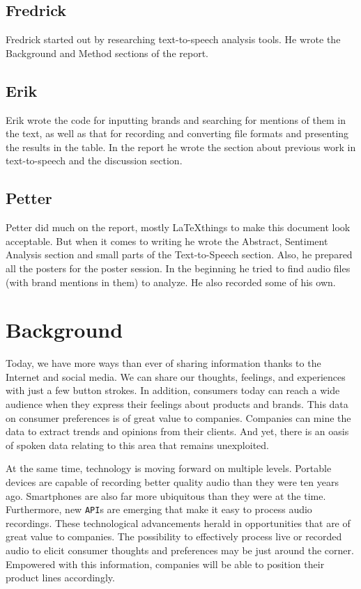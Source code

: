 \documentclass[a4paper,12pt,twoside]{ltxdoc}
\begin{document}
\subsection{Fredrick}
Fredrick started out by researching text-to-speech analysis tools. He wrote the Background and Method sections of the report.

\subsection{Erik}
Erik wrote the code for inputting brands and searching for mentions of them in the text, as well as that for recording and converting file formats and presenting the results in the table. In the report he wrote the section about previous work in text-to-speech and the discussion section.




\subsection{Petter}
Petter did much on the report, mostly \LaTeX things to make this document look acceptable. But when it comes to writing he wrote the Abstract, Sentiment Analysis section and small parts of the Text-to-Speech section.  Also, he prepared all the posters for the poster session. In the beginning he tried to find audio files (with brand mentions in them) to analyze. He also recorded some of his own.

\newpage
\section{Background}
Today, we have more ways than ever of sharing information thanks to the Internet and social media. We can share our
thoughts, feelings, and experiences with just a few button strokes. In addition, consumers today can reach a wide audience
when they express their feelings about products and brands. This data on consumer preferences is of great value to companies.
Companies can mine the data to extract trends and opinions from their clients. And yet, there is an oasis of spoken
data relating to this area that remains unexploited.

At the same time, technology is moving forward on multiple levels. Portable devices are capable of recording better quality
audio than they were ten years ago. Smartphones are also far more ubiquitous than they were at the time.
Furthermore, new \verb#API#s are emerging that make it easy to process audio recordings. These technological advancements herald
in opportunities that are of great value to companies. The possibility to effectively process live or recorded audio
to elicit consumer thoughts and preferences may be just around the corner. Empowered with this information, companies will
be able to position their product lines accordingly.
\end{document}
